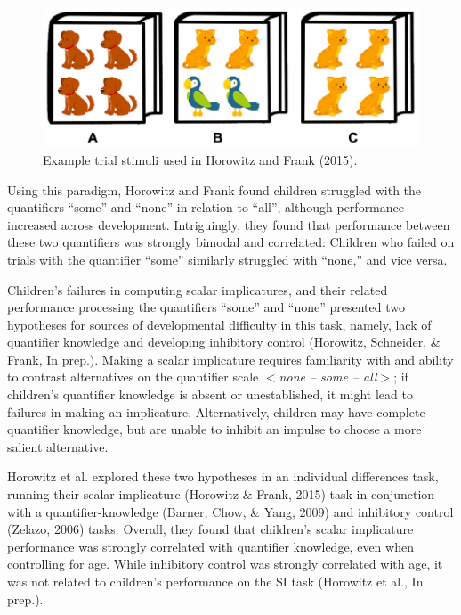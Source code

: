 \documentclass[10pt, letterpaper]{article}
\newenvironment{CodeChunk}{}{}
\begin{document}
\begin{CodeChunk}
\begin{figure}[b]

{\centering \includegraphics{figs/image-1} 

}

\caption[Example trial stimuli used in Horowitz and Frank (2015)]{Example trial stimuli used in Horowitz and Frank (2015).}\label{fig:image}
\end{figure}
\end{CodeChunk}

Using this paradigm, Horowitz and Frank found children struggled with
the quantifiers ``some'' and ``none'' in relation to ``all'', although
performance increased across development. Intriguingly, they found that
performance between these two quantifiers was strongly bimodal and
correlated: Children who failed on trials with the quantifier ``some''
similarly struggled with ``none,'' and vice versa.

Children's failures in computing scalar implicatures, and their related
performance processing the quantifiers ``some'' and ``none'' presented
two hypotheses for sources of developmental difficulty in this task,
namely, lack of quantifier knowledge and developing inhibitory control
(Horowitz, Schneider, \& Frank, In prep.). Making a scalar implicature
requires familiarity with and ability to contrast alternatives on the
quantifier scale \(<\)\emph{none -- some -- all}\(>\); if children's
quantifier knowledge is absent or unestablished, it might lead to
failures in making an implicature. Alternatively, children may have
complete quantifier knowledge, but are unable to inhibit an impulse to
choose a more salient alternative.

Horowitz et al. explored these two hypotheses in an individual
differences task, running their scalar implicature (Horowitz \& Frank,
2015) task in conjunction with a quantifier-knowledge (Barner, Chow, \&
Yang, 2009) and inhibitory control (Zelazo, 2006) tasks. Overall, they
found that children's scalar implicature performance was strongly
correlated with quantifier knowledge, even when controlling for age.
While inhibitory control was strongly correlated with age, it was not
related to children's performance on the SI task (Horowitz et al., In
prep.).
\end{document}
